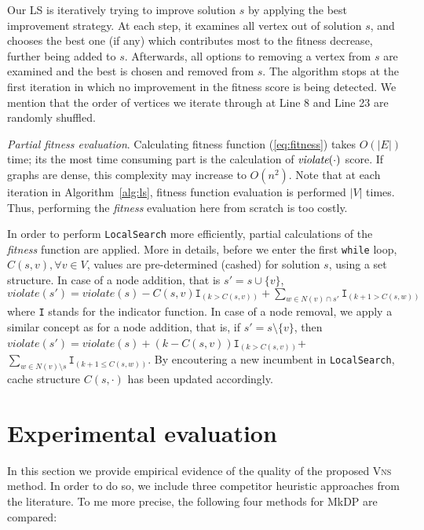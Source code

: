 \documentclass[dvipsnames,format=sigconf,anonymous=true,review=true]{acmart}
\begin{document}
Our LS is iteratively trying to improve solution $s$ by applying the best improvement strategy. At each step, it examines all vertex out of solution $s$, and chooses the best one (if any) which contributes most to the fitness decrease, further being added to $s$. Afterwards, all options to removing a vertex from $s$ are examined and the best is chosen and   removed from $s$.   The algorithm stops at the first iteration  in which no improvement in the fitness score is being detected.  We mention that the order of vertices we iterate through at Line 8 and Line 23 are randomly shuffled. 

\emph{Partial fitness evaluation}. Calculating fitness function (\ref{eq:fitness}) takes $O(|E|)$ time; its the most time consuming part is the calculation of $\emph{violate}(\cdot)$  score.   If graphs are dense, this complexity may increase to  $O(n^2)$. Note that at each iteration in Algorithm~\ref{alg:ls},  fitness function evaluation is performed $|V|$ times. Thus, performing the \emph{fitness} evaluation here from scratch is too costly. 

In order to perform \texttt{LocalSearch} more efficiently, partial calculations of the \emph{fitness} function are applied. More in details, before we enter the first \texttt{while} loop, $C(s, v), \forall v \in V$, values are pre-determined (cashed) for solution $s$, using a set structure. In case of a node addition, that is  $s' = s \cup \{v\} $, $violate(s') = violate(s) - C(s, v)  \texttt{I}_{(k> C(s,v))}  + \sum_{w\in N(v) \cap s'} \texttt{I}_{(k+1 > C(s, w))}  $ where \texttt{I} stands for the indicator function. 
In case of a node removal, we apply a similar concept as for a node addition, that is, if $s' = s \setminus \{v\}$, then $violate(s') =  violate(s) + ( k - C(s, v)) \texttt{I}_{( k > C(s, v))} $+ $\sum_{ w \in   N(v)  \setminus s} \texttt{I}_{(k+1 \leq C(s, w)) }$. By encoutering a new incumbent in \texttt{LocalSearch}, cache structure $C(s, \cdot)$ has been updated accordingly.


\section{Experimental evaluation}\label{sec:experiments}


In this section we provide empirical evidence of the quality of the proposed \textsc{Vns} method. In order to do so, we include three competitor heuristic approaches from the literature. To me more precise, the following four methods for MkDP are compared:  
\end{document}
